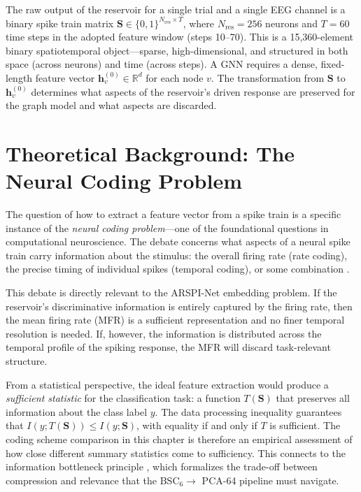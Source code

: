 The raw output of the reservoir for a single trial and a single EEG channel is a binary spike train matrix $\mathbf{S} \in \{0, 1\}^{N_{\text{res}} \times T}$, where $N_{\text{res}} = 256$ neurons and $T = 60$ time steps in the adopted feature window (steps 10--70). This is a 15,360-element binary spatiotemporal object---sparse, high-dimensional, and structured in both space (across neurons) and time (across steps). A GNN requires a dense, fixed-length feature vector $\mathbf{h}_v^{(0)} \in \mathbb{R}^d$ for each node $v$. The transformation from $\mathbf{S}$ to $\mathbf{h}_v^{(0)}$ determines what aspects of the reservoir's driven response are preserved for the graph model and what aspects are discarded.


\section{Theoretical Background: The Neural Coding Problem}
\label{sec:neural_coding_theory}

The question of how to extract a feature vector from a spike train is a specific instance of the \emph{neural coding problem}---one of the foundational questions in computational neuroscience. The debate concerns what aspects of a neural spike train carry information about the stimulus: the overall firing rate (rate coding), the precise timing of individual spikes (temporal coding), or some combination \cite{gerstner_spiking_2002, dayan2001, Rieke1997}.

This debate is directly relevant to the ARSPI-Net embedding problem. If the reservoir's discriminative information is entirely captured by the firing rate, then the mean firing rate (MFR) is a sufficient representation and no finer temporal resolution is needed. If, however, the information is distributed across the temporal profile of the spiking response, the MFR will discard task-relevant structure.

From a statistical perspective, the ideal feature extraction would produce a \emph{sufficient statistic} for the classification task: a function $T(\mathbf{S})$ that preserves all information about the class label $y$. The data processing inequality guarantees that $I(y; T(\mathbf{S})) \leq I(y; \mathbf{S})$, with equality if and only if $T$ is sufficient. The coding scheme comparison in this chapter is therefore an empirical assessment of how close different summary statistics come to sufficiency. This connects to the information bottleneck principle \cite{tishby_deep_2015}, which formalizes the trade-off between compression and relevance that the BSC$_6 \to$ PCA-64 pipeline must navigate.

